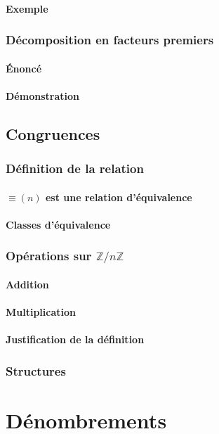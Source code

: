 \documentclass[12pt,a4paper,french]{book}
\begin{document}
			\subsubsection{Exemple}
		\subsection{Décomposition en facteurs premiers}
			\subsubsection{Énoncé}
			\subsubsection{Démonstration}
	\section{Congruences}
		\subsection{Définition de la relation}
			\subsubsection{$\equiv (n)$ est une relation d'équivalence}
			\subsubsection{Classes d'équivalence}
		\subsection{Opérations sur $\mathbb{Z}/ n\mathbb{Z}$}
			\subsubsection{Addition}
			\subsubsection{Multiplication}
			\subsubsection{Justification de la définition}
		\subsection{Structures}
		
		
			


\chapter{Dénombrements}

	
	
	
\end{document}
